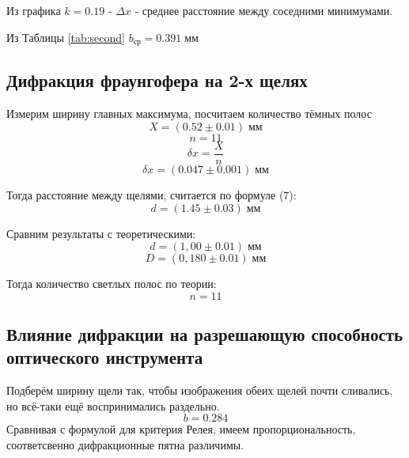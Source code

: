 \documentclass[a4paper, 12pt]{article}
\begin{document}

Из графика  $k = 0.19$ -  $\Delta x$ - среднее расстояние между соседними минимумами.

Из Таблицы \ref{tab:second} $b_{\text{ср}} = 0.391\; \text{мм}$ 


\subsection{Дифракция фраунгофера на 2-х щелях}

Измерим ширину главных максимума, посчитаем количество тёмных полос
\begin{equation*}
    X = (0.52 \pm 0.01)\; \text{мм}
\end{equation*}
\begin{equation*}
    n = 11
\end{equation*}
\begin{equation*}
    \delta x = \frac{X}{n}
\end{equation*}
\begin{equation*}
    \delta x = (0.047 \pm 0.001)\; \text{мм}
\end{equation*}

Тогда расстояние между щелями, считается по формуле (7):
\begin{equation*}
    d = (1.45 \pm 0.03)\; \text{мм}
\end{equation*}

Сравним результаты с теоретическими:
\begin{equation*}
    d = (1,00 \pm 0.01)\; \text{мм}
\end{equation*}
\begin{equation*}
    D = (0,180 \pm 0.01)\; \text{мм}
\end{equation*}

Тогда количество светлых полос по теории:
\begin{equation*}
    n = 11
\end{equation*}

\subsection{Влияние дифракции на разрешающую способность
оптического инструмента}
Подберём ширину щели так, чтобы изображения обеих щелей почти сливались, но всё-таки ещё воспринимались раздельно.
\begin{equation*}
    b = 0.284
\end{equation*}
Сравнивая с формулой для критерия Релея, имеем пропорциональность, соответсвенно дифракционные пятна различимы.
\end{document}
